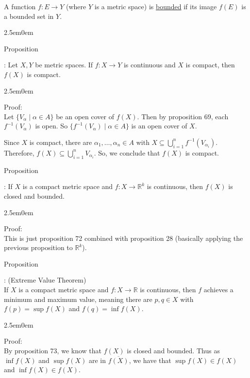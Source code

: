 \documentclass{book}
\newcommand{\hTwo}{%
   \color{MidnightBlue}%
   \fontsize{13}{15}\selectfont%
}
\newcommand{\hThree}{%
   \color{PineGreen}
   \fontsize{13}{15}\selectfont%
}
\newenvironment{myIndent}{%
   \begin{adjustwidth}{2.5em}{0em}%
}{%
   \end{adjustwidth}%
}
\newcommand{\udefine}[1]{%
   \setulcolor{Red}%
   \setul{0.14em}{0.07em}%
   \ul{#1}%
}
\newcommand{\retTwo}{\hfill\bigbreak}
\newcounter{PropNumber}
\newcommand{\propCount}[1][1]{%
   \addtocounter{PropNumber}{#1}%
   \thePropNumber%
}
\begin{document}
   A function $f: E \rightarrow Y$ (where $Y$ is a metric space) is \udefine{bounded} if its image $f(E)$ is a bounded set in $Y$.
   
   {\begin{myIndent} \hTwo
      Proposition \propCount: Let $X, Y$ be metric spaces. If $f: X \rightarrow Y$ is continuous and $X$ is compact, then $f(X)$ is compact.

      {\begin{myIndent} \hThree
         Proof:\\
         Let $\{V_\alpha \mid \alpha \in A\}$ be an open cover of $f(X)$. Then by proposition 69, each $f^{-1}(V_\alpha)$ is open. So $\{f^{-1}(V_\alpha) \mid \alpha \in A\}$ is an open cover of $X$. \retTwo

         Since $X$ is compact, there are $\alpha_1, \ldots, \alpha_n \in A$ with $X \subseteq {\displaystyle \bigcup\limits_{i=1}^n{f^{-1}(V_{\alpha_i})}}$. \\ Therefore, $f(X) \subseteq {\displaystyle \bigcup\limits_{i=1}^n{V_{\alpha_i}}}$. So, we conclude that $f(X)$ is compact. \retTwo
      \end{myIndent}}

      Proposition \propCount: If $X$ is a compact metric space and $f: X \rightarrow \mathbb{R}^k$ is continuous, then $f(X)$ is closed and bounded.

      {\begin{myIndent} \hThree
         Proof:\\
         This is just proposition 72 combined with proposition 28 (basically applying the previous proposition to $\mathbb{R}^k$). \retTwo \retTwo
      \end{myIndent}}

      Proposition \propCount: (Extreme Value Theorem)\\
      If $X$ is a compact metric space and $f: X\rightarrow \mathbb{R}$ is continuous, then $f$ achieves a minimum and maximum value, meaning there are $p, q \in X$ with $f(p) = \sup{f(X)}$ and $f(q) = \inf{f(X)}$.

      \newpage

      {\begin{myIndent} \hThree
         Proof:\\
         By proposition 73, we know that $f(X)$ is closed and bounded. Thus as\\ $\inf{f(X)}$ and $\sup{f(X)}$ are in $\overbar{f(X)}$, we have that $\sup{f(X)} \in f(X)$\\ [4pt] and $\inf{f(X)} \in f(X)$. \retTwo\retTwo
      \end{myIndent}}


\end{myIndent}}
\end{document}
